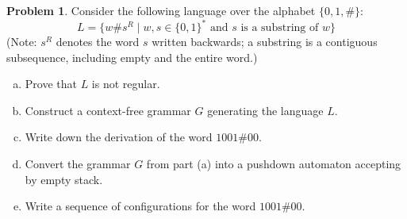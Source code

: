 \documentclass[a4paper,12pt]{article}
\theoremstyle{definition}
\newtheorem{problem}{Problem}
\begin{document}
\bigskip


\begin{problem}

    Consider the following language over the alphabet $\{0,1,\#\}$:
    $$
    L = \{w \# s^R \mid w,s\in\{0,1\}^*\text{ and $s$ is a substring of $w$}\}
    $$
    (Note: $s^R$ denotes the word $s$ written backwards; a substring is a contiguous subsequence, including empty and the entire word.)
    \begin{enumerate}[(a)]  
        \item Prove that $L$ is not regular.    
        \item Construct a context-free grammar $G$ generating the language $L$.
        \item Write down the derivation of the word $1001\#00$.
        \item Convert the grammar $G$ from part (a) into a pushdown automaton accepting by empty stack.
        \item Write a sequence of configurations for the word $1001\#00$.
    \end{enumerate}

\end{problem}

\bigskip
\end{document}
